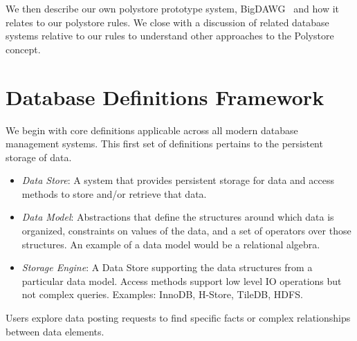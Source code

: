 \documentclass[conference]{IEEEtran}
\newcommand{\term}[1]{\emph{#1}}
\begin{document}
We then describe our own polystore prototype system, 
BigDAWG~\cite{Duggan2015} and how it relates to our polystore
rules.  We close with a discussion of related database systems 
relative to our rules to understand other approaches to the Polystore concept. 


\section{Database Definitions Framework}
\label{DefFramework}

We begin with core definitions applicable across all modern
database management systems. This first set of definitions
pertains to the persistent storage of data.

\begin{itemize}

\item \term{Data Store}: A system that 
provides persistent storage for data and access methods to 
store and/or retrieve that data.   

\item \term{Data Model}: Abstractions that define the 
structures around which data is organized, constraints on values
of the data, and a set of operators
over those structures. An example of a data model would be 
a relational algebra.

\item \term{Storage Engine}: A Data Store supporting the data 
structures from a  particular data model.  Access methods support
low level IO operations but not complex queries.  
Examples: InnoDB, H-Store, TileDB, HDFS.
\end{itemize}

Users explore data posting requests 
to find specific facts or complex relationships 
between data elements.  
\end{document}
